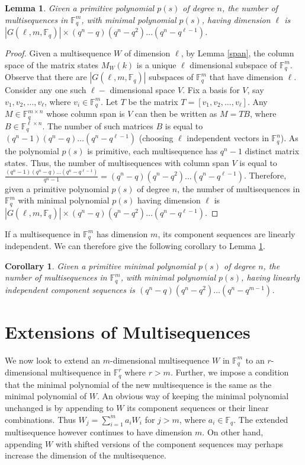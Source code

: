 \documentclass[letterpaper, 12 pt]{article}  \usepackage{amssymb}
\newtheorem{corollary}[theorem]{Corollary}
\newtheorem{lemma}[theorem]{Lemma}
\newcommand{\F}{\mathbb{F}}
\begin{document}
\begin{lemma}
\label{NoMult}
Given a primitive polynomial $p(s)$ of degree $n$, the number of
multisequences in $\F_q^m$, with minimal polynomial $p(s)$, having dimension
$\ell$ is $ |G(\ell,m,\F_q)|
\times (q^n-q)(q^n-q^2)\ldots(q^n-q^{\ell-1}) $.
\end{lemma}

\begin{proof}
 Given a multisequence $W$ of dimension $\ell$, by Lemma \ref{span},  
the column space of the matrix states $M_W(k)$ is a unique $\ell$
dimensional
subspace of $\F_q^m$.
Observe that there are $|G(\ell,m,\F_q)|$ subspaces of $\F_q^m$ that have
dimension $\ell$. Consider any one such $\ell-$ dimensional space $V$. Fix  a
basis
for $V$, say $v_1,v_2,\ldots, v_\ell$, where $v_i \in \F_q^m$. Let $T$ be
the matrix $ T = [v_1,v_2,\ldots,v_\ell]$. Any $M \in
\F_q^{m \times n}$ whose column span is $V$ can then be written as $M=TB$,
where $B \in \F_q^{\ell \times n}$. The number of such matrices $B$ is equal to 
$(q^n-1)(q^n-q)\ldots(q^n-q^{\ell-1})$ (choosing $\ell$ independent vectors in
$\F_q^n$). As the polynomial $p(s)$ is primitive, 
each multisequence has $q^n - 1$ distinct matrix states. Thus,
the number of multisequences with column span $V$ is
equal to $\frac{(q^n-1)(q^n-q)\ldots(q^n-q^{\ell-1})}{q^n-1} =
(q^n-q)(q^n-q^2)\ldots(q^n-q^{\ell-1})$. Therefore, given a primitive
polynomial $p(s)$ of degree $n$, the number of
multisequences in $\F_q^m$ with minimal polynomial $p(s)$ having dimension
$\ell$ is $ |G(\ell,m,\F_q)|
\times (q^n-q)(q^n-q^2)\ldots(q^n-q^{\ell-1}) $.
\end{proof}

If a multisequence in $\F_q^m$ has dimension $m$, its component sequences are
linearly independent. We can therefore give the following corollary to Lemma
\ref{NoMult}.

\begin{corollary}
\label{maincor}
Given a primitive minimal polynomial $p(s)$ of degree $n$, the number of
multisequences in $\F_q^m$, with minimal polynomial $p(s)$, having linearly
independent component sequences is
$(q^n-q)(q^n-q^2)\ldots(q^n-q^{m-1})$.
\end{corollary}

\section{Extensions of Multisequences}

We now look to extend an $m$-dimensional 
multisequence $W$ in $\F_q^m$  to an $r$-dimensional multisequence in $\F_q^r$ 
where $r > m$. Further, we impose a condition that the minimal polynomial of the new multisequence is 
the same as the minimal polynomial of $W$. An obvious way of keeping the 
minimal polynomial unchanged is by appending to $W$ its component sequences 
or their linear combinations. Thus $W_j = \sum_{i=1}^m a_iW_i$ for $j > m$, 
where $a_i \in \F_q$. The extended multisequence however continues to have dimension $m$.
On other hand, appending $W$ with shifted versions of the component sequences
may perhaps increase the dimension of the multisequence.
\end{document}
